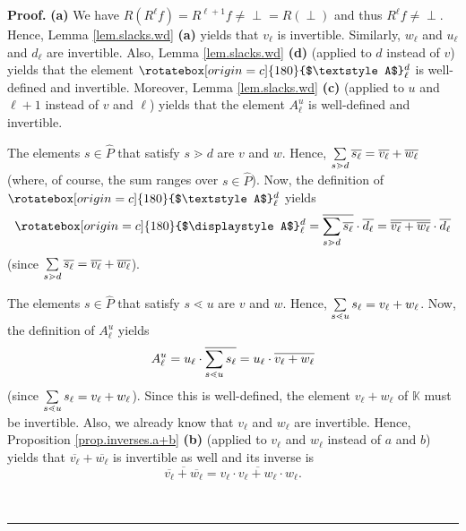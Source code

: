 \documentclass[numbers=enddot,12pt,final,onecolumn,notitlepage]{scrartcl}%
\theoremstyle{definition}
\newcommand{\undf}{\operatorname*{\bot}}
\newcommand{\upslack}{\mathchoice{\rotatebox[origin=c]{180}{$\displaystyle A$}}{\rotatebox[origin=c]{180}{$\textstyle A$}}{\rotatebox[origin=c]{180}{$\scriptstyle A$}}{\rotatebox[origin=c]{180}{$\scriptscriptstyle A$}}}
\newcommand{\downslack}{A}
\newenvironment{proof}[1][Proof]{\noindent\textbf{#1.} }{\ \rule{0.5em}{0.5em}}
\let\sumnonlimits\sum
\renewcommand{\sum}{\sumnonlimits\limits}
\begin{document}
\begin{proof}
\textbf{(a)} We have $R\left(  R^{\ell}f\right)  =R^{\ell+1}f\neq
\undf=R\left(  \undf\right)  $ and thus $R^{\ell}f\neq\undf$. Hence, Lemma
\ref{lem.slacks.wd} \textbf{(a)} yields that $v_{\ell}$ is invertible.
Similarly, $w_{\ell}$ and $u_{\ell}$ and $d_{\ell}$ are invertible. Also,
Lemma \ref{lem.slacks.wd} \textbf{(d)} (applied to $d$ instead of $v$) yields
that the element $\upslack_{\ell}^{d}$ is well-defined and invertible.
Moreover, Lemma \ref{lem.slacks.wd} \textbf{(c)} (applied to $u$ and $\ell+1$
instead of $v$ and $\ell$) yields that the element $\downslack_{\ell}^{u}$ is
well-defined and invertible.

The elements $s\in\widehat{P}$ that satisfy $s\gtrdot d$ are $v$ and $w$.
Hence, $\sum\limits_{s\gtrdot d}\overline{s_{\ell}}=\overline{v_{\ell}%
}+\overline{w_{\ell}}$ (where, of course, the sum ranges over $s\in
\widehat{P}$). Now, the definition of $\upslack_{\ell}^{d}$ yields%
\begin{equation}
\upslack_{\ell}^{d}=\overline{\sum\limits_{s\gtrdot d}\overline{s_{\ell}}%
}\cdot\overline{d_{\ell}}=\overline{\overline{v_{\ell}}+\overline{w_{\ell}}%
}\cdot\overline{d_{\ell}} \label{pf.lem.rect.four.1}%
\end{equation}
(since $\sum\limits_{s\gtrdot d}\overline{s_{\ell}}=\overline{v_{\ell}%
}+\overline{w_{\ell}}$).

The elements $s\in\widehat{P}$ that satisfy $s\lessdot u$ are $v$ and $w$.
Hence, $\sum\limits_{s\lessdot u}s_{\ell}=v_{\ell}+w_{\ell}$. Now, the
definition of $\downslack_{\ell}^{u}$ yields%
\begin{equation}
\downslack_{\ell}^{u}=u_{\ell}\cdot\overline{\sum\limits_{s\lessdot u}s_{\ell
}}=u_{\ell}\cdot\overline{v_{\ell}+w_{\ell}} \label{pf.lem.rect.four.2}%
\end{equation}
(since $\sum\limits_{s\lessdot u}s_{\ell}=v_{\ell}+w_{\ell}$). Since this is
well-defined, the element $v_{\ell}+w_{\ell}$ of $\mathbb{K}$ must be
invertible. Also, we already know that $v_{\ell}$ and $w_{\ell}$ are
invertible. Hence, Proposition \ref{prop.inverses.a+b} \textbf{(b)} (applied
to $v_{\ell}$ and $w_{\ell}$ instead of $a$ and $b$) yields that
$\overline{v_{\ell}}+\overline{w_{\ell}}$ is invertible as well and its
inverse is%
\[
\overline{\overline{v_{\ell}}+\overline{w_{\ell}}}=v_{\ell}\cdot
\overline{v_{\ell}+w_{\ell}}\cdot w_{\ell}.
\]



\end{proof}
\end{document}
